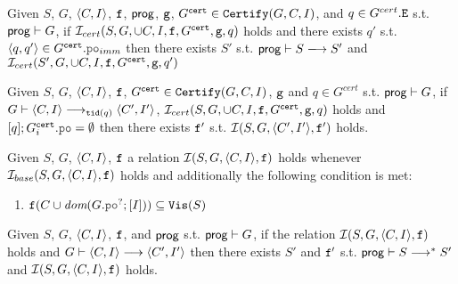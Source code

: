 \documentclass[12pt]{article}
\begin{document}
\begin{lemma}
  Given $S$, $G$, $\langle C, I \rangle$, ${\mathtt{f}}$, $\mathsf{prog}$,
  ${\mathtt{g}}$, $G^{{\mathtt{cert}}} \in {\mathtt{Certify}}(G, C, I)$, and $q \in G^{cert}.{\mathtt{E}}$
  s.t. $\mathsf{prog} \vdash G$,
  if $\mathcal{I}_{cert}(S, G, \cup{C, I}, {\mathtt{f}}, G^{{\mathtt{cert}}}, {\mathtt{g}}, q)$ holds 
  and there exists $q'$ s.t. $\tup{q, q'} \in G^{\cert}.\lPO_{imm}$
  then there exists $S'$ s.t. $\Prog \vdash S \esstep{} S'$ and
  $\mathcal{I}_{cert}(S', G, \cup{C, I}, {\mathtt{f}}, G^{{\mathtt{cert}}}, {\mathtt{g}}, q')$
\end{lemma}

\begin{lemma}
  Given $S$, $G$, $\langle C, I \rangle$, ${\mathtt{f}}$, 
  $G^{{\mathtt{cert}}} \in {\mathtt{Certify}}(G, C, I)$, ${\mathtt{g}}$ and $q \in G^{cert}$
  s.t. $\mathsf{prog} \vdash G$, if $G \vdash \langle C, I \rangle \longrightarrow_{{\mathtt{tid}}(q)} \langle C', I' \rangle$, 
  $\mathcal{I}_{cert}(S, G, \cup{C, I}, {\mathtt{f}}, G^{{\mathtt{cert}}}, {\mathtt{g}}, q)$ holds 
  and $[q];G_{i}^{\cert}.\lPO = \emptyset$ then there exists
  ${\mathtt{f}}'$ s.t. $\mathcal{I}(S, G, \langle C', I' \rangle, {\mathtt{f}}')$ holds.
\end{lemma}

\begin{definition}
  \label{def:sim-rel}
  Given $S$, $G$, $\langle C, I \rangle$, ${\mathtt{f}}$ a relation $\mathcal{I}(S, G, \langle C, I \rangle, {\mathtt{f}})$ holds
  whenever $\mathcal{I}_{base}(S, G, \langle C, I \rangle, {\mathtt{f}})$ holds and additionally
  the following condition is met:
  \begin{enumerate}[label=\textbf{S.\arabic*},start=8]
    \item \label{item:sim-vis}
       $\f(C \cup \dom{G.\lPO^?;[I]}) \subseteq \lVIS(S)$
  \end{enumerate}
\end{definition}

\begin{lemma}
  \label{lemma:sim-step}
  Given $S$, $G$, $\langle C, I \rangle$, ${\mathtt{f}}$, and $\mathsf{prog}$ 
  s.t. $\mathsf{prog} \vdash G$,
  if the relation $\mathcal{I}(S, G, \langle C, I \rangle, {\mathtt{f}})$ holds
  and $G \vdash \langle C, I \rangle \longrightarrow \langle C', I' \rangle$
  then there exists $S'$ and ${\mathtt{f}}'$ s.t.
  $\mathsf{prog} \vdash S \longrightarrow^* S'$ and
  $\mathcal{I}(S, G, \langle C, I \rangle, {\mathtt{f}})$ holds.
\end{lemma}

  

\end{document}
